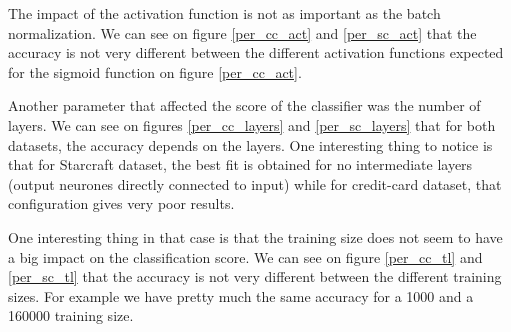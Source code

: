 \documentclass[10pt]{article}
\begin{document}
		The impact of the activation function is not as important as the batch normalization. We can see on figure \ref{per_cc_act} and \ref{per_sc_act} that the accuracy is not very different between the different activation functions expected for the sigmoid function on figure \ref{per_cc_act}.

		Another parameter that affected the score of the classifier was the number of layers. We can see on figures \ref{per_cc_layers} and \ref{per_sc_layers} that for both datasets, the accuracy depends on the layers. One interesting thing to notice is that for Starcraft dataset, the best fit is obtained for no intermediate layers (output neurones directly connected to input) while for credit-card dataset, that configuration gives very poor results.

		One interesting thing in that case is that the training size does not seem to have a big impact on the classification score. We can see on figure \ref{per_cc_tl} and \ref{per_sc_tl} that the accuracy is not very different between the different training sizes. For example we have pretty much the same accuracy for a 1000 and a 160000 training size.
\end{document}
